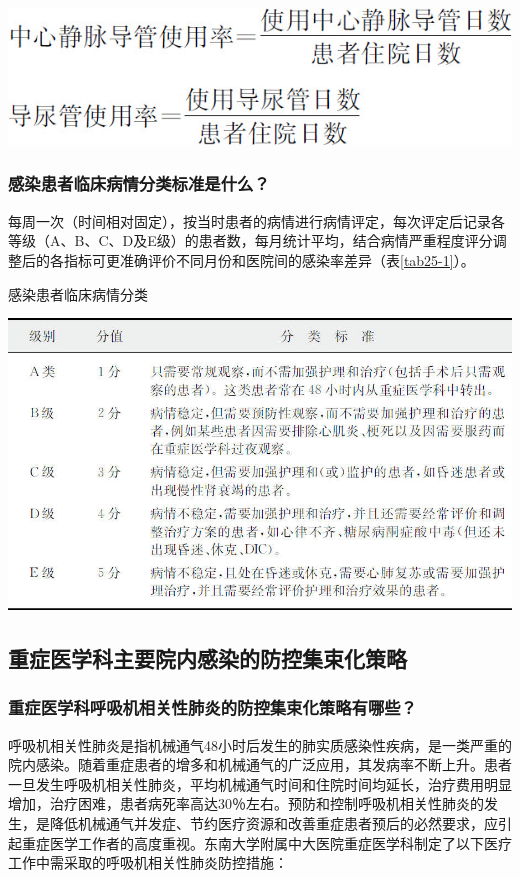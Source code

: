 \begin{center}
\includegraphics{./images/Image00295.jpg}
\end{center}

\subsubsection{感染患者临床病情分类标准是什么？}

每周一次（时间相对固定），按当时患者的病情进行病情评定，每次评定后记录各等级（A、B、C、D及E级）的患者数，每月统计平均，结合病情严重程度评分调整后的各指标可更准确评价不同月份和医院间的感染率差异（表\ref{tab25-1}）。

\begin{table}[htbp]
\centering
\caption{感染患者临床病情分类}
\label{tab25-1}
\includegraphics{./images/Image00296.jpg}
\end{table}

\subsection{重症医学科主要院内感染的防控集束化策略}

\subsubsection{重症医学科呼吸机相关性肺炎的防控集束化策略有哪些？}

呼吸机相关性肺炎是指机械通气48小时后发生的肺实质感染性疾病，是一类严重的院内感染。随着重症患者的增多和机械通气的广泛应用，其发病率不断上升。患者一旦发生呼吸机相关性肺炎，平均机械通气时间和住院时间均延长，治疗费用明显增加，治疗困难，患者病死率高达30％左右。预防和控制呼吸机相关性肺炎的发生，是降低机械通气并发症、节约医疗资源和改善重症患者预后的必然要求，应引起重症医学工作者的高度重视。东南大学附属中大医院重症医学科制定了以下医疗工作中需采取的呼吸机相关性肺炎防控措施：


